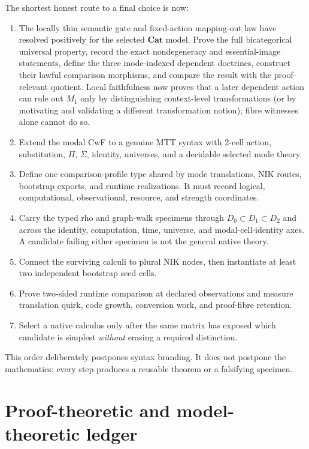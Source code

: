 \documentclass[11pt]{article}
\theoremstyle{definition}
\theoremstyle{remark}
\begin{document}
The shortest honest route to a final choice is now:

\begin{enumerate}
\item The locally thin semantic gate and fixed-action mapping-out law have
  resolved positively for the selected $\mathbf{Cat}$ model.  Prove the full
  bicategorical universal property, record the exact nondegeneracy and
  essential-image statements, define the three mode-indexed dependent
  doctrines, construct their lawful comparison morphisms, and compare the
  result with the proof-relevant quotient.  Local faithfulness now
  proves that a later dependent action can rule out $M_1$ only by distinguishing
  context-level transformations (or by motivating and validating a different
  transformation notion); fibre witnesses alone cannot do so.
\item Extend the modal CwF to a genuine MTT syntax with $2$-cell action,
  substitution, $\Pi$, $\Sigma$, identity, universes, and a decidable selected
  mode theory.
\item Define one comparison-profile type shared by mode translations, NIK
  routes, bootstrap exports, and runtime realizations.  It must record logical,
  computational, observational, resource, and strength coordinates.
\item Carry the typed rho and graph-walk specimens through $D_0\subset
  D_1\subset D_2$ and across the identity, computation, time, universe, and
  modal-cell-identity axes.  A candidate failing either specimen is not the
  general native theory.
\item Connect the surviving calculi to plural NIK nodes, then instantiate at
  least two independent bootstrap seed cells.
\item Prove two-sided runtime comparison at declared observations and measure
  translation quirk, code growth, conversion work, and proof-fibre retention.
\item Select a native calculus only after the same matrix has exposed which
  candidate is simplest \emph{without} erasing a required distinction.
\end{enumerate}

This order deliberately postpones syntax branding.  It does not postpone the
mathematics: every step produces a reusable theorem or a falsifying specimen.

\section{Proof-theoretic and model-theoretic ledger}
\end{document}
